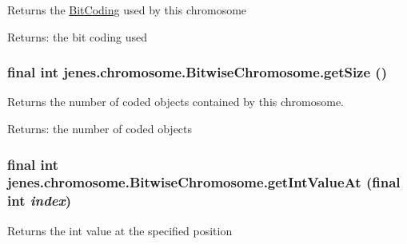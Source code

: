 Returns the \hyperlink{}{BitCoding} used by this chromosome

\begin{Desc}
\item[Returns:]the bit coding used \end{Desc}
\hypertarget{classjenes_1_1chromosome_1_1_bitwise_chromosome_e59ae8f495ec9d5aa15712cee7c0b313}{
\subsubsection[getSize]{\setlength{\rightskip}{0pt plus 5cm}final int jenes.chromosome.BitwiseChromosome.getSize ()}}
\label{classjenes_1_1chromosome_1_1_bitwise_chromosome_e59ae8f495ec9d5aa15712cee7c0b313}


Returns the number of coded objects contained by this chromosome.

\begin{Desc}
\item[Returns:]the number of coded objects \end{Desc}
\hypertarget{classjenes_1_1chromosome_1_1_bitwise_chromosome_f817cb2110fc6b8d415e46377ddd4911}{
\subsubsection[getIntValueAt]{\setlength{\rightskip}{0pt plus 5cm}final int jenes.chromosome.BitwiseChromosome.getIntValueAt (final int {\em index})}}
\label{classjenes_1_1chromosome_1_1_bitwise_chromosome_f817cb2110fc6b8d415e46377ddd4911}


Returns the int value at the specified position

